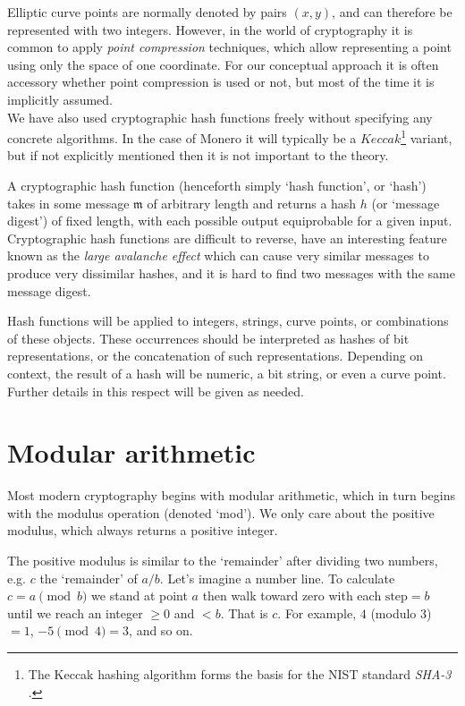 Elliptic curve points are normally denoted by pairs \((x, y)\), and can therefore be represented with two integers. However, in the world of cryptography it is common to apply {\em point compression} techniques, which allow representing a point using only the space of one coordinate. For our conceptual approach it is often accessory whether point compression is used or not, but most of the time it is implicitly assumed.\\

We have also used cryptographic hash functions freely without specifying any concrete algorithms. In the case of Monero it will typically be a \(\mathit{Keccak}\)\footnote{\label{kekkak_note}The Keccak hashing algorithm forms the basis for the NIST standard {\em SHA-3} \cite{nist-sha3}.} variant, but if not explicitly mentioned then it is not important to the theory. 

A cryptographic hash function (henceforth simply `hash function', or `hash') takes in some message $\mathfrak{m}$ of arbitrary length and returns a hash $h$ (or `message digest') of fixed length, with each possible output equiprobable for a given input. Cryptographic hash functions are difficult to reverse, have an interesting feature known as the {\em large avalanche effect} which can cause very similar messages to produce very dissimilar hashes, and it is hard to find two messages with the same message digest.

Hash functions will be applied to integers, strings, curve points, or combinations of these objects. These occurrences should be interpreted as hashes of bit representations, or the concatenation of such representations. Depending on context, the result of a hash will be numeric, a bit string, or even a curve point. Further details in this respect will be given as needed.



\section{Modular arithmetic}
\label{sec:modular-arithmetic}

Most modern cryptography begins with modular arithmetic, which in turn begins with the modulus operation (denoted `mod'). We only care about the positive modulus, which always returns a positive integer.

The positive modulus is similar to the `remainder' after dividing two numbers, e.g. $c$ the `remainder' of $a/b$. Let's imagine a number line. To calculate $c = a \pmod b$ we stand at point $a$ then walk toward zero with each $\text{step} = b$ until we reach an integer $\geq{0}$ and $<b$. That is $c$. For example, $4$ (modulo 3) $= 1$, $-5 \pmod 4 = 3$, and so on.

